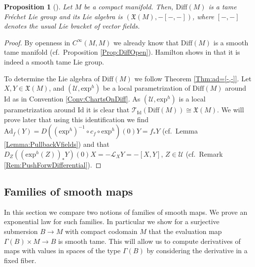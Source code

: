 \documentclass[12pt,a4paper]{article}
\theoremstyle{plain}
\newtheorem{proposition}[theorem]{Proposition}
\theoremstyle{definition}
\newcommand{\VFs}{\mathfrak{X}(M)}
\newcommand{\LieD}{\mathcal{L}}
\newcommand{\Diff}{\mathrm{Diff}(M)}
\newcommand{\eh}[1]{\mathrm{exp}^h(#1)}
\newcommand{\exh}{\mathrm{exp}^h}
\newcommand{\Id}{\mathrm{Id}}
\newcommand{\Ucal}{\mathcal{U}}
\begin{document}
\begin{proposition}[{\cite[Part II, Theorem 2.3.5]{hamilton}}]
\label{Proposition:DiffLieGrAndLieAlg} 
Let $M$ be a compact manifold. Then, $\Diff$ is a tame Fréchet Lie group and its Lie algebra is $(\VFs,-[-,-])$, where $[-,-]$ denotes the usual Lie bracket of vector fields.
\end{proposition}
\begin{proof}
By openness in $C^\infty(M,M)$ we already know that $\Diff$ is a smooth tame manifold (cf.~Proposition \ref{Prop:DiffOpen}). Hamilton shows in \cite[Part II, Theorem 2.3.5]{hamilton} that it is indeed a smooth tame Lie group. 

To determine the Lie algebra of $\Diff$ we follow Theorem \ref{Thm:ad=[-,-]}. Let $X,Y\in \VFs$, and $(\Ucal,\exh)$ be a local parametrization of $\Diff$ around $\Id$ as in Convention \ref{Conv:ChartsOnDiff}. As $(\Ucal,\exh)$ is a local parametrization around $\Id$ it is clear that $\mathcal{T}_{\Id}(\Diff)\cong \VFs$. We will prove later that using this identification we find 
$\mathrm{Ad}_f(Y)=D((\exh)^{-1}\circ c_f\circ \exh)(0)Y=f_*Y$ (cf.~Lemma \ref{Lemma:PullbackVfields}) and that $D_Z((\eh{Z})_*Y)(0)X=-\LieD_XY=-[X,Y]$, $Z\in \Ucal$ (cf.~Remark \ref{Rem:PushForwDifferential}).  
\end{proof}




\subsection{Families of smooth maps}

In this section we compare two notions of families of smooth maps. We prove an exponential law for such families. In particular we show for a surjective submersion $B\to M$ with compact codomain $M$ that the evaluation map $\Gamma(B)\times M\to B$ is smooth tame. This will allow us to compute derivatives of maps with values in spaces of the type $\Gamma(B)$ by considering the derivative in a fixed fiber.
\end{document}
